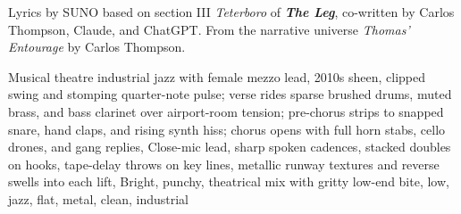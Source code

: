 
\begin{notes}
Lyrics by SUNO based on section III \emph{Teterboro} of \emph{\bfseries The Leg}, %
co-written by Carlos Thompson, Claude, and ChatGPT. %
From the narrative universe \emph{Thomas’ Entourage} by Carlos Thompson.
\end{notes}
\begin{style}
Musical theatre industrial jazz with female mezzo lead, 2010s sheen, clipped swing and stomping quarter-note pulse; verse rides sparse brushed drums, muted brass, and bass clarinet over airport-room tension; pre-chorus strips to snapped snare, hand claps, and rising synth hiss; chorus opens with full horn stabs, cello drones, and gang replies, Close-mic lead, sharp spoken cadences, stacked doubles on hooks, tape-delay throws on key lines, metallic runway textures and reverse swells into each lift, Bright, punchy, theatrical mix with gritty low-end bite, low, jazz, flat, metal, clean, industrial
\end{style}
